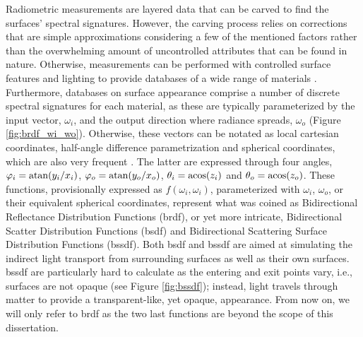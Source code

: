 Radiometric measurements are layered data that can be carved to find the surfaces' spectral signatures. However, the carving process relies on corrections that are simple approximations considering a few of the mentioned factors rather than the overwhelming amount of uncontrolled attributes that can be found in nature. Otherwise, measurements can be performed with controlled surface features and lighting to provide databases of a wide range of materials \cite{dupuy_adaptive_2018}. Furthermore, databases on surface appearance comprise a number of discrete spectral signatures for each material, as these are typically parameterized by the input vector, $\omega_i$, and the output direction where radiance spreads, $\omega_o$ (Figure \ref{fig:brdf_wi_wo}). Otherwise, these vectors can be notated as local cartesian coordinates, half-angle difference parametrization and spherical coordinates, which are also very frequent \cite{montes_soldado_overview_2012}. The latter are expressed through four angles, $\varphi_i = \operatorname*{atan}(y_i / x_i)$, $\varphi_o = \operatorname*{atan}(y_o / x_o)$, $\theta_i = \operatorname*{acos}(z_i)$ and $\theta_o = \operatorname*{acos}(z_o)$. These functions, provisionally expressed as $f(\omega_i, \omega_i)$, parameterized with $\omega_i$, $\omega_o$, or their equivalent spherical coordinates, represent what was coined as Bidirectional Reflectance Distribution Functions (\acrshort{brdf}), or yet more intricate, Bidirectional Scatter Distribution Functions (\acrshort{bsdf}) and Bidirectional Scattering Surface Distribution Functions (\acrshort{bssdf}). Both \acrshort{bsdf} and \acrshort{bssdf} are aimed at simulating the indirect light transport from surrounding surfaces as well as their own surfaces. \acrshort{bssdf} are particularly hard to calculate as the entering and exit points vary, i.e., surfaces are not opaque (see Figure \ref{fig:bssdf}); instead, light travels through matter to provide a transparent-like, yet opaque, appearance. From now on, we will only refer to \acrshort{brdf} as the two last functions are beyond the scope of this dissertation.
